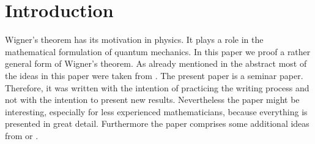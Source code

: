 \section{Introduction}

Wigner's theorem has its motivation in physics. It plays a role in the mathematical formulation of quantum mechanics. In this paper we proof a rather general form of Wigner's theorem. As already mentioned in the abstract most of the ideas in this paper were taken from \cite{spiegel2018constructive}. The present paper is a seminar paper. Therefore, it was written with the intention of practicing the writing process and not with the intention to present new results. Nevertheless the paper might be interesting, especially for less experienced mathematicians, because everything is presented in great detail. Furthermore the paper comprises some additional ideas from \cite{Geh_r_2014} or \cite{Bargmann_1964}. 




